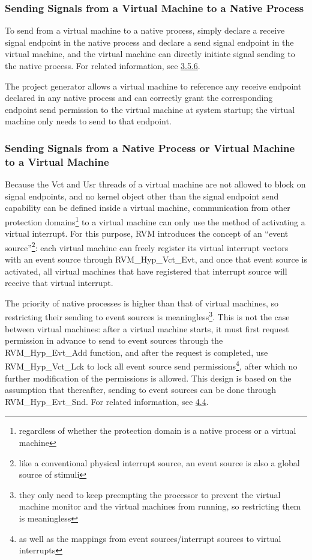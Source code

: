 \subsubsection{Sending Signals from a Virtual Machine to a Native Process}\label{subsubsec:2-2-7-2}

To send from a virtual machine to a native process, simply declare a receive signal endpoint in the native process and declare a send signal endpoint in the virtual machine, and the virtual machine can directly initiate signal sending to the native process. For related information, see \protect\hyperref[subsec:3-5-6]{3.5.6}.

The project generator allows a virtual machine to reference any receive endpoint declared in any native process and can correctly grant the corresponding endpoint send permission to the virtual machine at system startup; the virtual machine only needs to send to that endpoint.

\subsubsection{Sending Signals from a Native Process or Virtual Machine to a Virtual Machine}\label{subsubsec:2-2-7-3}

Because the Vct and Usr threads of a virtual machine are not allowed to block on signal endpoints, and no kernel object other than the signal endpoint send capability can be defined inside a virtual machine, communication from other protection domains\footnote{regardless of whether the protection domain is a native process or a virtual machine} to a virtual machine can only use the method of activating a virtual interrupt. For this purpose, RVM introduces the concept of an ``event source''\footnote{like a conventional physical interrupt source, an event source is also a global source of stimuli}: each virtual machine can freely register its virtual interrupt vectors with an event source through RVM\_Hyp\_Vct\_Evt, and once that event source is activated, all virtual machines that have registered that interrupt source will receive that virtual interrupt.

The priority of native processes is higher than that of virtual machines, so restricting their sending to event sources is meaningless\footnote{they only need to keep preempting the processor to prevent the virtual machine monitor and the virtual machines from running, so restricting them is meaningless}. This is not the case between virtual machines: after a virtual machine starts, it must first request permission in advance to send to event sources through the RVM\_Hyp\_Evt\_Add function, and after the request is completed, use RVM\_Hyp\_Vct\_Lck to lock all event source send permissions\footnote{as well as the mappings from event sources/interrupt sources to virtual interrupts}, after which no further modification of the permissions is allowed. This design is based on the assumption that thereafter, sending to event sources can be done through RVM\_Hyp\_Evt\_Snd. For related information, see \protect\hyperref[sec:4-4]{4.4}.


